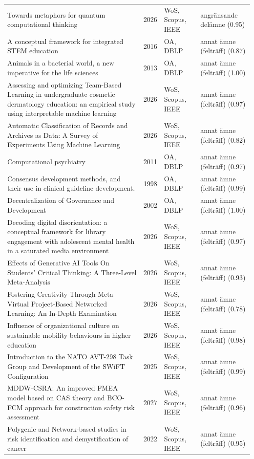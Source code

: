 \begin{longtable}{@{}%
  >{\raggedright\arraybackslash}p{}c%
  >{\raggedright\arraybackslash}p{}%
  >{\raggedright\arraybackslash}p{}@{}}
Towards metaphors for quantum computational thinking & 2026 & WoS, Scopus, IEEE & angränsande delämne (0.95) \\
A conceptual framework for integrated STEM education & 2016 & OA, DBLP & annat ämne (felträff) (0.87) \\
Animals in a bacterial world, a new imperative for the life sciences & 2013 & OA, DBLP & annat ämne (felträff) (1.00) \\
Assessing and optimizing Team-Based Learning in undergraduate cosmetic dermatology education: an empirical study using interpretable machine learning & 2026 & WoS, Scopus, IEEE & annat ämne (felträff) (0.97) \\
Automatic Classification of Records and Archives as Data: A Survey of Experiments Using Machine Learning & 2026 & WoS, Scopus, IEEE & annat ämne (felträff) (0.82) \\
Computational psychiatry & 2011 & OA, DBLP & annat ämne (felträff) (0.97) \\
Consensus development methods, and their use in clinical guideline development. & 1998 & OA, DBLP & annat ämne (felträff) (0.99) \\
Decentralization of Governance and Development & 2002 & OA, DBLP & annat ämne (felträff) (1.00) \\
Decoding digital disorientation: a conceptual framework for library engagement with adolescent mental health in a saturated media environment & 2026 & WoS, Scopus, IEEE & annat ämne (felträff) (0.97) \\
Effects of Generative AI Tools On Students' Critical Thinking: A Three-Level Meta-Analysis & 2026 & WoS, Scopus, IEEE & annat ämne (felträff) (0.93) \\
Fostering Creativity Through Meta Virtual Project-Based Networked Learning: An In-Depth Examination & 2026 & WoS, Scopus, IEEE & annat ämne (felträff) (0.78) \\
Influence of organizational culture on sustainable mobility behaviours in higher education & 2026 & WoS, Scopus, IEEE & annat ämne (felträff) (0.98) \\
Introduction to the NATO AVT-298 Task Group and Development of the SWiFT Configuration & 2025 & WoS, Scopus, IEEE & annat ämne (felträff) (0.99) \\
MDDW-CSRA: An improved FMEA model based on CAS theory and BCO-FCM approach for construction safety risk assessment & 2027 & WoS, Scopus, IEEE & annat ämne (felträff) (0.96) \\
Polygenic and Network-based studies in risk identification and demystification of cancer & 2022 & WoS, Scopus, IEEE & annat ämne (felträff) (0.95) \\

\end{longtable}
